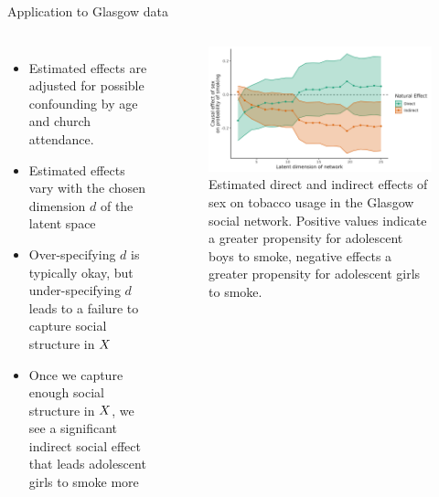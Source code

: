 \documentclass[aspectratio=169]{beamer}
\theoremstyle{remark}
\begin{document}
\begin{frame}{Application to Glasgow data}

    \begin{columns}


        \footnotesize

        \begin{itemize}
            \item Estimated effects are adjusted for possible confounding by age and church attendance.
            \item Estimated effects vary with the chosen dimension $d$ of the latent space
            \item Over-specifying $d$ is typically okay, but under-specifying $d$ leads to a failure to capture social structure in $X$
            \item Once we capture enough social structure in $X$, we see a significant indirect social effect that leads adolescent girls to smoke more
        \end{itemize}


        \begin{figure}[ht!]
            \centering
            \includegraphics[width=\textwidth]{figures/glasgow/effects.png}
            \caption{\footnotesize Estimated direct and indirect effects of sex on tobacco usage in the Glasgow social network. Positive values indicate a greater propensity for adolescent boys to smoke, negative effects a greater propensity for adolescent girls to smoke.}
            \label{fig:glasgow-estimates}
        \end{figure}
    \end{columns}

\end{frame}
\end{document}
